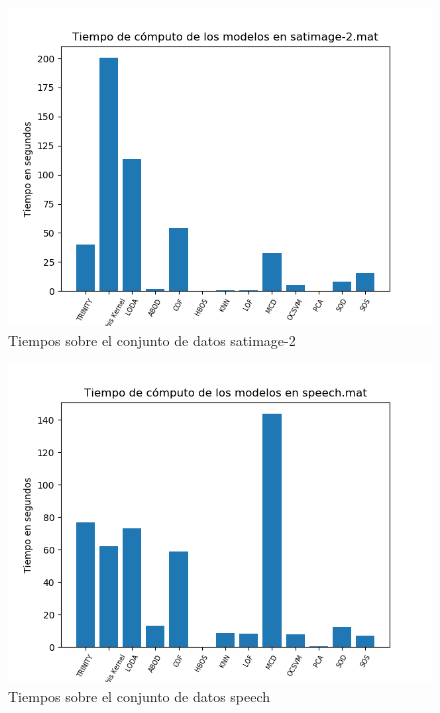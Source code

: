 \begin{figure}[H]
	\centering
	\includegraphics[scale=0.7]{imagenes/imgs-exp1/times/satimage-2}
	\caption{Tiempos sobre el conjunto de datos satimage-2}
	\label{satimage-2_times}
\end{figure}

\begin{figure}[H]
	\centering
	\includegraphics[scale=0.7]{imagenes/imgs-exp1/times/speech}
	\caption{Tiempos sobre el conjunto de datos speech}
	\label{speech_times}
\end{figure}

